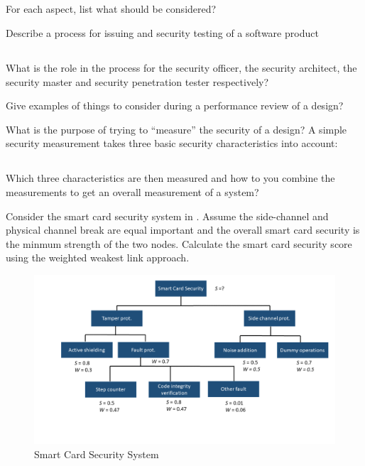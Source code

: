 \begin{questions}
\begin{parts}
  \part{} For each aspect, list what should be considered?
  \end{parts}

\question{} Describe a process for issuing and security testing of a software product
  \begin{parts}
  \part{} What is the role in the process for the security officer, the security architect, the security master and security penetration tester respectively?
  \end{parts}

\question{} Give examples of things to consider during a performance review of a design?

\question{} What is the purpose of trying to ``measure'' the security of a design?
\question{} A simple security measurement takes three basic security characteristics into account:
  \begin{parts}
  \part{} Which three characteristics are then measured and how to you combine the measurements to get an overall measurement of a system?
  \end{parts}

\question{} Consider the smart card security system in .
  Assume the side-channel and physical channel break are equal important and the overall smart card security is the minmum strength of the two nodes.
  Calculate the smart card security score using the weighted weakest link approach.
  \begin{figure}[h!]
    \centering
    \includegraphics[scale=0.35]{./Drawings/EITP20-Secure_Systems_Engineering/Smart_Card_Security_System.png}
    \caption{Smart Card Security System}
    \label{fig:Smart_Card_Security_System}
  \end{figure}



\end{questions}
